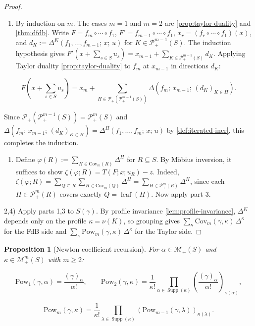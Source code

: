 \documentclass[10pt,a4paper]{article}
\theoremstyle{plain}
\newtheorem{proposition}[theorem]{Proposition}
\theoremstyle{definition}
\newcommand{\1}{\mathbb{1}} %
\newcommand{\KP}{\mathcal{P}}
\newcommand{\tightlist}{\setlength{\itemsep}{0pt}\setlength{\parskip}{0pt}}
\newcommand{\KM}{\mathcal{M}} %
\newcommand{\Cov}{\mathrm{Cov}} %
\DeclareMathOperator{\lf}{\mathrm{leaf}} %
\DeclareMathOperator{\supp}{\mathrm{Supp}} %
\begin{document}
\begin{proof}

\begin{enumerate}
\def\labelenumi{\arabic{enumi})}
\setcounter{enumi}{2}
\tightlist
\item
  By induction on \(m\). The cases \(m = 1\) and \(m = 2\) are
  \ref{prop:taylor-duality} and \ref{thm:dfdb}. Write
  \(F = f_m \circ \cdots \circ f_1\),
  \(F' = f_{m-1} \circ \cdots \circ f_1\),
  \(x_r = (f_r \circ \cdots \circ f_1)(x)\), and
  \(d_K := \Delta^K(f_1, \dots, f_{m-1};\, x;\, u)\) for
  \(K \in \KP_+^{m-1}(S)\). The induction hypothesis gives
  \(F'(x + \sum_{s \in S} u_s) = x_{m-1} + \sum_{K \in \KP_+^{m-1}(S)} d_K\).
  Applying Taylor duality \ref{prop:taylor-duality} to \(f_m\) at
  \(x_{m-1}\) in directions \(d_K\):
\end{enumerate}

\[
  F(x + {\textstyle\sum_{s \in S}} u_s) = x_m + \sum_{H \in \KP_+(\KP_+^{m-1}(S))} \Delta(f_m;\, x_{m-1};\, (d_K)_{K \in H}).
\]

Since \(\KP_+(\KP_+^{m-1}(S)) = \KP_+^m(S)\) and
\(\Delta(f_m;\, x_{m-1};\, (d_K)_{K \in H}) = \Delta^H(f_1, \dots, f_m;\, x;\, u)\)
by \ref{def:iterated-incr}, this completes the induction.

\begin{enumerate}
\def\labelenumi{\arabic{enumi})}
\tightlist
\item
  Define \(\varphi(R) := \sum_{H \in \Cov_m(R)} \Delta^H\) for
  \(R \subseteq S\). By Möbius inversion, it suffices to show
  \(\zeta(\varphi; R) = T(F; x; u_R) - z\). Indeed,
  \(\zeta(\varphi; R) = \sum_{Q \subseteq R} \sum_{H \in \Cov_m(Q)} \Delta^H = \sum_{H \in \KP_+^m(R)} \Delta^H\),
  since each \(H \in \KP_+^m(R)\) covers exactly \(Q = \lf(H)\). Now
  apply part 3.
\end{enumerate}

2,4) Apply parts 1,3 to \(S(\gamma)\). By profile invariance
\ref{lem:profile-invariance}, \(\Delta^{K}\) depends only on the profile
\(\kappa = \nu(K)\), so grouping gives
\(\sum_\kappa \Cov_m(\gamma, \kappa)\, \Delta^{\kappa}\) for the FdB
side and
\(\sum_\kappa \mathrm{Pow}_m(\gamma, \kappa)\, \Delta^{\kappa}\) for the
Taylor side.

\end{proof}

\begin{proposition}[Newton coefficient recursion]

\label{prop:newton-recursion} For \(\alpha \in \KM_+(S)\) and
\(\kappa \in \KM_+^m(S)\) with \(m \geq 2\):

\[
  \mathrm{Pow}_1(\gamma, \alpha) = \frac{(\gamma)_\alpha}{\alpha!}, \qquad \mathrm{Pow}_2(\gamma, \kappa) = \frac{1}{\kappa!} \prod_{\alpha \in \supp(\kappa)} \left(\frac{(\gamma)_\alpha}{\alpha!}\right)_{\kappa(\alpha)},
\]

\[
  \mathrm{Pow}_m(\gamma, \kappa) = \frac{1}{\kappa!} \prod_{\lambda \in \supp(\kappa)} (\mathrm{Pow}_{m-1}(\gamma, \lambda))_{\kappa(\lambda)}.
\]

\end{proposition}
\end{document}
